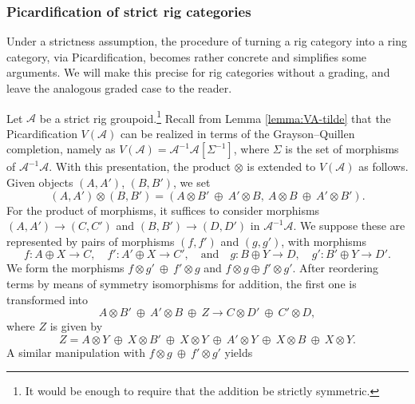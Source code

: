 \documentclass[JEP,XML,SOM,Unicode,published]{cedram}
\newcommand{\quand}{\quad\text{and}\quad}
\theoremstyle{plain}
\theoremstyle{definition}
\newcommand{\Acal}{\mathcal A}
\begin{document}
\subsubsection{Picardification of strict rig categories}\label{subsubsec:strict-rig-categories}
Under a strictness assumption, the procedure of turning a rig category into a ring category, via Picardification, becomes rather concrete and simplifies some arguments. We will make this precise for rig categories without a grading, and leave the analogous graded case to the reader.

Let $\Acal$ be a strict rig groupoid.\footnote{It would be enough to require that the addition be strictly symmetric.} Recall from Lemma \ref{lemma:VA-tilde} that the Picardification $V(\Acal)$ can be realized in terms of the Grayson--Quillen completion, namely as \hbox{$V(\Acal)=\Acal^{-1}\Acal[\Sigma^{-1}]$}, where $\Sigma$ is the set of morphisms of $\Acal^{-1}\Acal$. With this presentation, the product $\otimes$ is extended to $V(\Acal)$ as follows. Given objects $(A,A')$, $(B,B')$, we set\vspace*{-3pt}
\begin{equation}\label{eq:explicit-product-A-A}
(A,A')\otimes (B,B')=(A\otimes B'\ \oplus\ A'\otimes B,\ A\otimes B\ \oplus\ A'\otimes B').
\end{equation}
For the product of morphisms, it suffices to consider morphisms $(A,A')\to (C,C')$ and $(B,B')\to (D,D')$ in $\Acal^{-1}\Acal$. We suppose these are represented by pairs of morphisms $(f,f')$ and $(g,g')$, with morphisms\vspace*{-3pt}
\[
f\colon A\oplus X\to C,\quad f'\colon A'\oplus X\to C',\quand g\colon B\oplus Y\to D,\quad g'\colon B'\oplus Y\to D'.
\]
We form the morphisms $f\otimes g'\ \oplus\ f'\otimes g$ and $f\otimes g\oplus f'\otimes g'$. After reordering terms by means of symmetry isomorphisms for addition, the first one is transformed into\vspace*{-3pt}
\begin{equation}\label{eq:product-morphism-1}
A\otimes B'\ \oplus\ A'\otimes B\ \oplus\ Z\to C\otimes D'\ \oplus\ C'\otimes D,
\end{equation}
where $Z$ is given by\vspace*{-3pt}
\begin{displaymath}
Z=A\otimes Y\ \oplus\ X\otimes B'\ \oplus\ X\otimes Y\ \oplus\ A'\otimes Y\ \oplus\ X\otimes B\ \oplus\ X\otimes Y.
\end{displaymath}
A similar manipulation with $f\otimes g\ \oplus\ f'\otimes g'$ yields\vspace*{-3pt}
\end{document}
